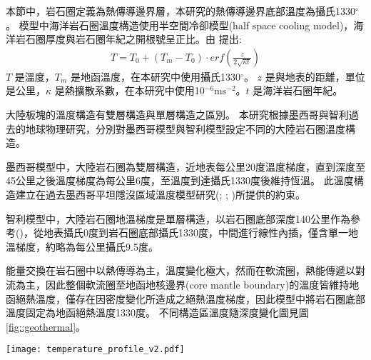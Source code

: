 

本節中，岩石圈定義為熱傳導邊界層，本研究的熱傳導邊界底部溫度為攝氏1330$^{\circ}$。
模型中海洋岩石圈溫度構造使用半空間冷卻模型(half space cooling model)，海洋岩石圈厚度與岩石圈年紀之開根號呈正比。由 \citet{davis1974}提出:
\begin{align}
T=T_0+(T_m-T_0)\cdot erf(\frac{z}{2\sqrt{\kappa t}}) \label{eq:Half Space Model}
\end{align}
$T$ 是溫度，$T_m$ 是地函溫度，在本研究中使用攝氏1330$^{\circ}$。
$z$ 是與地表的距離，單位是公里，$\kappa$ 是熱擴散系數，在本研究中使用10$^{-6}$ms$^{-2}$。$t$ 是海洋岩石圈年紀。

大陸板塊的溫度構造有雙層構造與單層構造之區別。
本研究根據墨西哥與智利過去的地球物理研究，分別對墨西哥模型與智利模型設定不同的大陸岩石圈溫度構造。

墨西哥模型中，大陸岩石圈為雙層構造，近地表每公里20度溫度梯度，直到深度至45公里之後溫度梯度為每公里6度，至溫度到達攝氏1330度後維持恆溫。
此溫度構造建立在過去墨西哥平坦隱沒區域溫度模型研究(\citealp{Manea2005}; \citealp{Manea2011Thermal}; \citealp{Manea2011Curie})所提供的約束。

智利模型中，大陸岩石圈地溫梯度是單層構造，以岩石圈底部深度140公里作為參考(\citealp{perez2008})，從地表攝氏0度到岩石圈底部攝氏1330度，中間進行線性內插，僅含單一地溫梯度，約略為每公里攝氏9.5度。

能量交換在岩石圈中以熱傳導為主，溫度變化極大，然而在軟流圈，熱能傳遞以對流為主，因此整個軟流圈至地函地核邊界(core mantle boundary)的溫度皆維持地函絕熱溫度，僅存在因密度變化所造成之絕熱溫度梯度，因此模型中將岩石圈底部溫度固定為地函絕熱溫度1330度。
不同構造區溫度隨深度變化圖見圖\ref{fig::geothermal}。
\begin{figure*}[ht!]
    \centering
    \texttt{[image: temperature\_profile\_v2.pdf]}
    \caption[本研究使用之模型地下溫度剖面圖]{本研究使用之模型地下溫度剖面圖，左圖為智利模型，右圖為墨西哥模型。藍色實線為海洋岩石圈地溫梯度，由式\ref{eq:Half Space Model}與海洋岩石圈年紀決定。咖啡色實線為大陸岩石圈地溫梯度，智利模型大陸岩石圈為單層構造，墨西哥模型大陸岩石圈為雙層構造。圖中並沒有考量絕熱地溫梯度。}
    \label{fig::geothermal}
\end{figure*}


